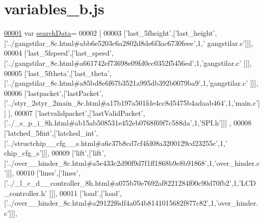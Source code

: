 \hypertarget{variables__b_8js_source}{}\section{variables\+\_\+b.\+js}
\label{variables__b_8js_source}

\begin{DoxyCode}
\hypertarget{variables__b_8js_source.tex_l00001}{}\hyperlink{variables__b_8js_ad01a7523f103d6242ef9b0451861231e}{00001} var \hyperlink{variables__b_8js_ad01a7523f103d6242ef9b0451861231e}{searchData}=
00002 [
00003   [\textcolor{stringliteral}{'last\_5fheight'},[\textcolor{stringliteral}{'last\_height'},[\textcolor{stringliteral}{'../gangstilar\_8c.html#abb6e5203c6a2802d8de6f3ac6730feee'},1,\textcolor{stringliteral}{'
      gangstilar.c'}]]],
00004   [\textcolor{stringliteral}{'last\_5fspeed'},[\textcolor{stringliteral}{'last\_speed'},[\textcolor{stringliteral}{'../gangstilar\_8c.html#a661742ef73698e09fd0cc0352f5456ed'},1,\textcolor{stringliteral}{'gangstilar.c'}
      ]]],
00005   [\textcolor{stringliteral}{'last\_5ftheta'},[\textcolor{stringliteral}{'last\_theta'},[\textcolor{stringliteral}{'../gangstilar\_8c.html#a85bd8e6f67b3521a995db392b0079ba9'},1,\textcolor{stringliteral}{'gangstilar.c'}
      ]]],
00006   [\textcolor{stringliteral}{'lastpacket'},[\textcolor{stringliteral}{'lastPacket'},[\textcolor{stringliteral}{'../styr\_2styr\_2main\_8c.html#a17b197a501fde4cc8d5475b4adaab464'},1,\textcolor{stringliteral}{'main.c'}]]
      ],
00007   [\textcolor{stringliteral}{'lastvalidpacket'},[\textcolor{stringliteral}{'lastValidPacket'},[\textcolor{stringliteral}{'../\_s\_p\_i\_8h.html#ab15ab508531e452eb0768f69f7c588da'},1,\textcolor{stringliteral}{'SPI.h'}]]]
      ,
00008   [\textcolor{stringliteral}{'latched\_5fint'},[\textcolor{stringliteral}{'latched\_int'},[\textcolor{stringliteral}{'../structchip\_\_cfg\_\_s.html#a6c37b8cd7cf4fd08a3200129cd23255c'},1,\textcolor{stringliteral}{'
      chip\_cfg\_s'}]]],
00009   [\textcolor{stringliteral}{'lift'},[\textcolor{stringliteral}{'lift'},[\textcolor{stringliteral}{'../over\_\_hinder\_8c.html#a5e433c2d90f9d7f1ff1868b9e8b91868'},1,\textcolor{stringliteral}{'over\_hinder.c'}]]],
00010   [\textcolor{stringliteral}{'lines'},[\textcolor{stringliteral}{'lines'},[\textcolor{stringliteral}{'../\_l\_c\_d\_\_controller\_8h.html#a075b70e7692af8221284f00c90d70fb2'},1,\textcolor{stringliteral}{'LCD\_controller.h'}
      ]]],
00011   [\textcolor{stringliteral}{'load'},[\textcolor{stringliteral}{'load'},[\textcolor{stringliteral}{'../over\_\_hinder\_8c.html#a29122f6df4a054b8141015682f877c82'},1,\textcolor{stringliteral}{'over\_hinder.c'}]]],

\end{DoxyCode}
